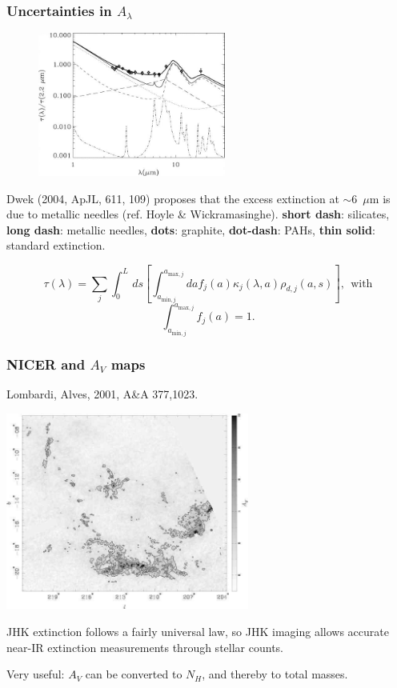 \begin{frame}\frametitle{Uncertainties in $A_\lambda$}

\begin{figure}
\includegraphics[width=0.55\textwidth, height = !]{./D/dwek_fig1.jpg}
\end{figure}  Dwek (2004, ApJL, 611, 109)
proposes that the excess extinction at $\sim$6~$\mu\mathrm{m}$ is due
to metallic needles (ref. Hoyle \& Wickramasinghe).  {\bf short dash}:
silicates, {\bf long dash}: metallic needles, {\bf dots}: graphite,
{\bf dot-dash}: PAHs, {\bf thin solid}: standard extinction.




\[
\tau(\lambda) = \sum_j \int_0^L\,ds \left[
\int_{a_{\mathrm{min},j}}^{a_{\mathrm{max},j}} da f_j(a)
\kappa_j(\lambda,a) \rho_{d,j}(a,s)\right], ~~\text{with} 
\]
\[
\int_{a_{\mathrm{min},j}}^{a_{\mathrm{max},j}}  f_j(a) = 1.
\]



\end{frame}

\begin{frame}\frametitle{NICER and $A_V$ maps}

Lombardi, Alves, 2001, A\&A 377,1023.

\begin{center}
\includegraphics[width=0.6\textwidth,height=!]{./D/lombardi_alves_NICER.jpg}
\end{center}

JHK extinction follows a fairly universal law, so JHK imaging allows
accurate near-IR extinction measurements through stellar counts.

Very useful: $A_V$ can be converted to $N_H$, and thereby to total
masses.


\end{frame}

